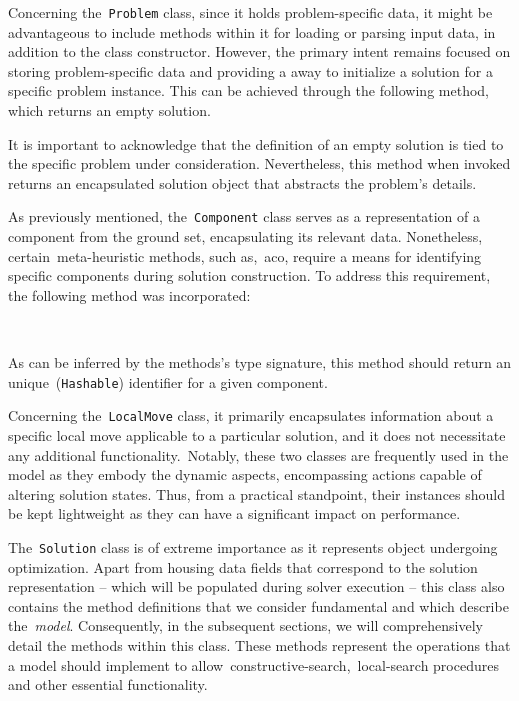 Concerning the~\texttt{Problem} class, since it holds problem-specific data, it
might be advantageous to include methods within it for loading or parsing input
data, in addition to the class constructor. However, the primary intent remains
focused on storing problem-specific data and providing a away to initialize a
solution for a specific problem instance. This can be achieved through the
following method, which returns an empty solution.

\begin{center}
\end{center}

It is important to acknowledge that the definition of an empty solution is tied
to the specific problem under consideration. Nevertheless, this method when
invoked returns an encapsulated solution object that abstracts the problem's details.

As previously mentioned, the~\texttt{Component} class serves as a representation
of a component from the ground set, encapsulating its relevant data.
Nonetheless, certain~\acrshort{meta-heuristic} methods, such as,~\acrshort{aco},
require a means for identifying specific components during solution
construction. To address this requirement, the following method was
incorporated:

\begin{center}
  \\
\end{center}

As can be inferred by the methods's type signature, this method should return
an unique~(\texttt{Hashable}) identifier for a given component.

Concerning the~\texttt{LocalMove} class, it primarily encapsulates information
about a specific local move applicable to a particular solution, and it does not
necessitate any additional functionality.~Notably, these two classes are
frequently used in the model as they embody the dynamic aspects, encompassing
actions capable of altering solution states. Thus, from a practical standpoint,
their instances should be kept lightweight as they can have a significant impact
on performance.

The~\texttt{Solution} class is of extreme importance as it represents object
undergoing optimization. Apart from housing data fields that correspond to the
solution representation -- which will be populated during solver execution --
this class also contains the method definitions that we consider fundamental and
which describe the~\emph{model}. Consequently, in the subsequent sections, we
will comprehensively detail the methods within this class. These methods
represent the operations that a model should implement to
allow~\acrshort{constructive-search},~\acrshort{local-search} procedures and
other essential functionality.

